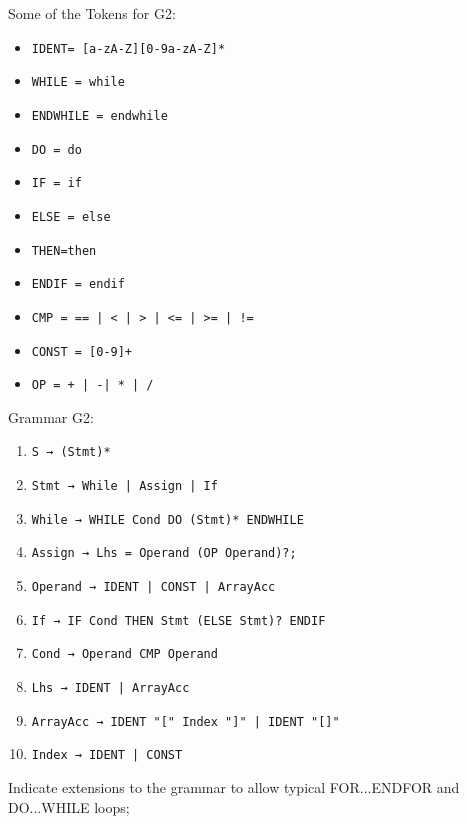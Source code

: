 \documentclass[docid=2019]{comp_exam_round2}
\begin{document}
\noindent
\begin{minipage}[t]{0.41\textwidth}
    Some of the Tokens for G2:
    
    \begin{itemize}[wide, noitemsep, label={}]
        \item \texttt{IDENT= [a-zA-Z][0-9a-zA-Z]*}
        \item \texttt{WHILE = while}
        \item \texttt{ENDWHILE = endwhile}
        \item \texttt{DO = do}
        \item \texttt{IF = if}
        \item \texttt{ELSE = else}
        \item \texttt{THEN=then}
        \item \texttt{ENDIF = endif}
        \item \texttt{CMP = == | < | > | <= | >= | !=}
        \item \texttt{CONST = [0-9]+}
        \item \texttt{OP = + | -| * | /}
    \end{itemize}
\end{minipage}
\begin{minipage}[t]{0.58\textwidth}
    Grammar G2:
    
    \begin{enumerate}
        \item \texttt{S → (Stmt)*}
        \item \texttt{Stmt → While | Assign | If}
        \item \texttt{While → WHILE Cond DO (Stmt)* ENDWHILE}
        \item \texttt{Assign → Lhs = Operand (OP Operand)?;}
        \item \texttt{Operand → IDENT | CONST | ArrayAcc}
        \item \texttt{If → IF Cond THEN Stmt (ELSE Stmt)? ENDIF}
        \item \texttt{Cond → Operand CMP Operand}
        \item \texttt{Lhs → IDENT | ArrayAcc}
        \item \texttt{ArrayAcc → IDENT "[" Index "]" | IDENT "[]"}
        \item \texttt{Index → IDENT | CONST}
    \end{enumerate}
\end{minipage}

\question
Indicate extensions to the grammar to allow typical FOR...ENDFOR and DO...WHILE loops;
\end{document}
